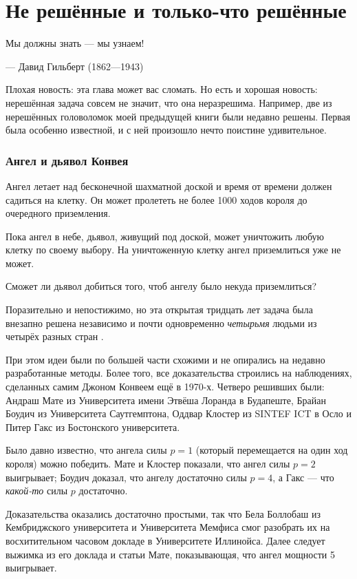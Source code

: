 \chapter{Не решённые и только-что решённые}


\setlength{\epigraphwidth}{.80\textwidth}
\epigraph{Мы должны знать --- мы узнаем!
}{--- Давид Гильберт (1862---1943)}

Плохая новость: эта глава может вас сломать.
Но есть и хорошая новость: нерешённая задача совсем не значит, что она неразрешима.
Например, две из нерешённых головоломок моей предыдущей книги были недавно решены.
Первая была особенно известной, и с ней произошло нечто поистине удивительное.

\subsection*{Ангел и дьявол Конвея}

Ангел летает над бесконечной шахматной доской и время от времени
должен садиться на клетку.
Он может пролететь не более 1000 ходов короля до очередного приземления.

Пока ангел в небе, дьявол, живущий под доской, может уничтожить любую клетку по своему выбору. На уничтоженную клетку ангел приземлиться уже не может.

Сможет ли дьявол добиться того, чтоб ангелу было некуда приземлиться?

\medskip

Поразительно и непостижимо, но эта открытая тридцать лет задача была внезапно решена независимо и почти одновременно
\emph{четырьмя} людьми из четырёх разных стран \cite{10, 20, 40, 43}.

При этом идеи были по большей части схожими и не опирались на недавно разработанные методы.
Более того, все доказательства строились на наблюдениях, сделанных самим Джоном Конвеем ещё в 1970-х.
Четверо решивших были:
Андраш Мате из Университета имени Этвёша Лоранда в Будапеште,
Брайан Боудич из Университета Саутгемптона,
Оддвар Клостер из SINTEF ICT в Осло
и Питер Гакс из Бостонского университета.

Было давно известно, что ангела силы $p=1$ (который перемещается на один ход короля) можно победить.
Мате и Клостер показали, что ангел силы $p=2$ выигрывает;
Боудич доказал, что ангелу достаточно силы $p=4$,
а Гакс --- что \emph{какой-то} силы $p$ достаточно.

Доказательства оказались достаточно простыми, так что Бела Боллобаш из Кембриджского университета и Университета Мемфиса смог разобрать их на восхитительном часовом докладе в Университете Иллинойса.
Далее следует выжимка из его доклада и статьи Мате, показывающая, что ангел мощности 5 выигрывает.

